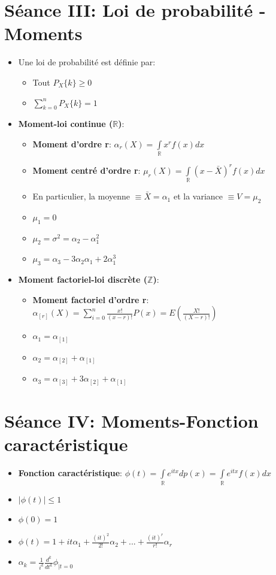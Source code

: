 \documentclass[a4paper,11pt]{report}
\begin{document}
\section{Séance III: Loi de probabilité - Moments}
\begin{itemize}
	\item Une loi de probabilité est définie par:
	\begin{itemize}
		\item Tout $P_X\{k\} \ge 0$
		\item $\sum\limits_{k=0}^{n}{P_X\{k\}} = 1$
	\end{itemize}
	\newpage
	\item \textbf{Moment-loi continue ($\mathbb{R}$)}:
	\begin{itemize}
		\item \textbf{Moment d'ordre r}: $\alpha_r(X) = \int\limits_{\mathbb{R}}{x^rf(x)dx}$
		\item \textbf{Moment centré d'ordre r}: $\mu_r(X) = \int\limits_{\mathbb{R}}{(x-\bar{X})^rf(x)dx}$
		\item En particulier, la moyenne $\equiv \bar{X} = \alpha_1$ et la variance $\equiv V=\mu_2$
		\item \textbf{$\mu_1 = 0$}
		\item \textbf{$\mu_2 = \sigma^2 = \alpha_2 - \alpha_1^2$}
		\item \textbf{$\mu_3 = \alpha_3 - 3\alpha_2 \alpha_1 + 2\alpha_1^3$}\\
	\end{itemize}
	\item \textbf{Moment factoriel-loi discrète ($\mathbb{Z}$)}:
	\begin{itemize}
		\item \textbf{Moment factoriel d'ordre r}: $\alpha_{[r]}(X) = \sum\limits_{i = 0}^{n}{\frac{x!}{(x-r)!}P(x)} = E(\frac{X!}{(X-r)!})$
		\item \textbf{$\alpha_1 = \alpha_{[1]}$}
		\item \textbf{$\alpha_2 = \alpha_{[2]} + \alpha_{[1]}$}
		\item \textbf{$\alpha_3 = \alpha_{[3]} + 3\alpha_{[2]} + \alpha_{[1]}$}
	\end{itemize}
\end{itemize}

\section{Séance IV: Moments-Fonction caractéristique}
\begin{itemize}
	\item \textbf{Fonction caractéristique}: $\phi(t) = \int\limits_{\mathbb{R}}{e^{itx}dp(x)} = \int\limits_{\mathbb{R}}{e^{itx}f(x)dx}$
	\item \textbf{$|\phi(t)| \le 1$}
	\item \textbf{$\phi(0) = 1$}
	\item \textbf{$\phi(t) = 1 + it\alpha_1 + \frac{(it)^2}{2!}\alpha_2 + ... + \frac{(it)^r}{r!}\alpha_r$}
	\item \textbf{$\alpha_k = \frac{1}{i^k}\frac{d^k}{dt^k} \phi_{|t=0}$}
\end{itemize}
\end{document}
